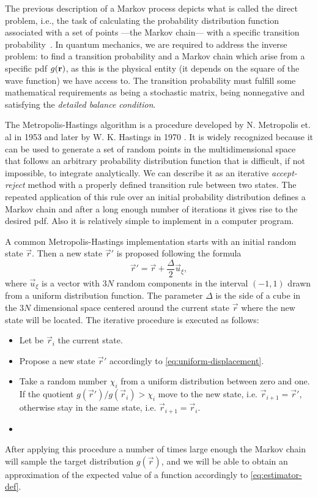 The previous description of a Markov process depicts what is called {the direct
    problem}, i.e., the task of calculating the probability distribution function
associated with a set of points ---the Markov chain--- with a specific
transition probability~\cite{bib:guardiola.1998}. In quantum mechanics, we are
required to address the inverse problem: to find a transition probability and a
Markov chain which arise from a specific pdf $g(\mathbf{r})$, as this is the physical
entity (it depends on the square of the wave function) we have access to. The
transition probability must fulfill some mathematical requirements as being a
stochastic matrix, being nonnegative and satisfying the \textit{detailed balance
  condition}.

The Metropolis-Hastings algorithm is a procedure developed by N. Metropolis et.
al in 1953 \cite{bib:metropolis-j-chem-phys.21.1087.1953} and later by W. K.
Hastings in 1970 \cite{bib:hastings-biometrika.57.97.1970}. It is widely
recognized because it can be used to generate a set of random points in the
multidimensional space that follows an arbitrary probability distribution
function that is difficult, if not impossible, to integrate analytically. We can
describe it as an iterative \textit{accept-reject} method with a properly
defined transition rule between two states. The repeated application of this
rule over an initial probability distribution defines a Markov chain and after a
long enough number of iterations it gives rise to the desired pdf. Also it is
relatively simple to implement in a computer program.

A common Metropolis-Hastings implementation starts with an initial random state
$\vec r$. Then a new state $\vec r'$ is proposed following the formula
%
\begin{equation}
  \label{eq:uniform-displacement}
  \vec r' = \vec r + \frac{\Delta}{2} \vec u_{\xi},
\end{equation}
%
where $\vec u_\xi$ is a vector with $3N$ random components in the interval $(-1,
  1)$ drawn from a uniform distribution function. The parameter $\Delta$ is the
side of a cube in the $3N$ dimensional space centered around the current state
$\vec r$ where the new state will be located. The iterative procedure is
executed as follows:
%
\begin{itemize}
  \item Let be $\vec r_i$ the current state.

  \item Propose a new state $\vec r'$ accordingly to
        \eqref{eq:uniform-displacement}.

  \item Take a random number $\chi_i$ from a uniform distribution between zero
        and one. If the quotient $g(\vec r') / g(\vec r_i) > \chi_i$ move to the
        new state, i.e. $\vec r_{i+1} = \vec r'$, otherwise stay in the same
        state, i.e. $\vec r_{i+1} = \vec r_i$.
  \item
\end{itemize}
%
After applying this procedure a number of times large enough the Markov chain
will sample the target distribution $g(\vec r)$, and we will be able to obtain
an approximation of the expected value of a function accordingly to
\eqref{eq:estimator-def}.

